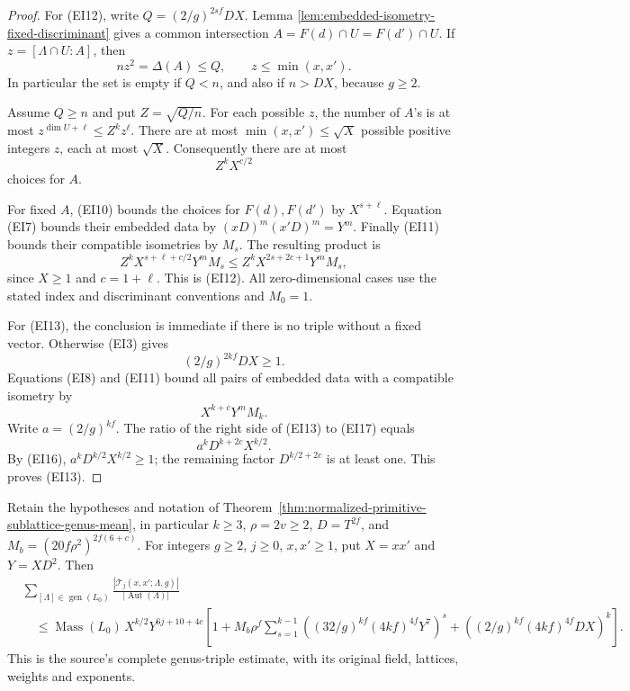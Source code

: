 \begin{proof}
For (EI12), write \(Q=(2/g)^{2sf}DX\).  Lemma
\ref{lem:embedded-isometry-fixed-discriminant} gives a
common intersection \(A=F(d)\cap U=F(d')\cap U\).
If \(z=[\Lambda\cap U:A]\), then
\[
             nz^2=\Delta(A)\leq Q,\qquad
                         z\leq\min(x,x').
 \tag{EI14}
\]
In particular the set is empty if \(Q<n\), and also
if \(n>DX\), because \(g\geq2\).

Assume \(Q\geq n\) and put \(Z=\sqrt{Q/n}\).
For each possible \(z\), the number of \(A\)'s is at
most \(z^{\dim U+\ell}\leq Z^kz^\ell\).
There are at most \(\min(x,x')\leq\sqrt X\) possible
positive integers \(z\), each at most \(\sqrt X\).
Consequently there are at most
\[
                             Z^kX^{c/2}
 \tag{EI15}
\]
choices for \(A\).

For fixed \(A\), (EI10) bounds the choices for
\(F(d),F(d')\) by \(X^{s+\ell}\).  Equation (EI7)
bounds their embedded data by
\((xD)^m(x'D)^m=Y^m\).  Finally (EI11) bounds their
compatible isometries by \(M_s\).
The resulting product is
\[
 Z^kX^{s+\ell+c/2}Y^mM_s
                     \leq Z^kX^{2s+2c+1}Y^mM_s,
\]
since \(X\geq1\) and \(c=1+\ell\).  This is (EI12).
All zero-dimensional cases use the stated index and
discriminant conventions and \(M_0=1\).

For (EI13), the conclusion is immediate if there is
no triple without a fixed vector.  Otherwise (EI3)
gives
\[
                          (2/g)^{2kf}DX\geq1.
 \tag{EI16}
\]
Equations (EI8) and (EI11) bound all pairs of embedded
data with a compatible isometry by
\[
                              X^{k+c}Y^mM_k.
 \tag{EI17}
\]
Write \(a=(2/g)^{kf}\).  The ratio of the right side
of (EI13) to (EI17) equals
\[
                 a^kD^{k+2c}X^{k/2}.
\]
By (EI16), \(a^kD^{k/2}X^{k/2}\geq1\); the remaining
factor \(D^{k/2+2c}\) is at least one.  This proves
(EI13).
\end{proof}

\begin{theorem}
\label{thm:embedded-isometry-genus-mean}
Retain the hypotheses and notation of
Theorem~\ref{thm:normalized-primitive-sublattice-genus-mean},
in particular \(k\geq3\), \(\rho=2v\geq2\),
\(D=T^{2f}\), and \(M_b=(20f\rho^2)^{2f(6+c)}\).
For integers \(g\geq2\), \(j\geq0\), \(x,x'\geq1\),
put \(X=xx'\) and \(Y=XD^2\).  Then
\[
 \begin{split}
 &\sum_{[\Lambda]\in\operatorname{gen}(L_0)}
       \frac{|\mathcal T_j(x,x';\Lambda,g)|}
            {|\operatorname{Aut}(\Lambda)|}\\
 &\quad\leq
 \operatorname{Mass}(L_0)\,X^{k/2}Y^{6j+10+4c}
 \left[
 1+M_b\rho^f\sum_{s=1}^{k-1}
       \left((32/g)^{kf}(4kf)^{4f}Y^7\right)^s
       +\left((2/g)^{kf}(4kf)^{4f}DX\right)^k
 \right].
 \end{split}
 \tag{EI18}
\]
This is the source's complete genus-triple estimate, with
its original field, lattices, weights and exponents.
\end{theorem}

